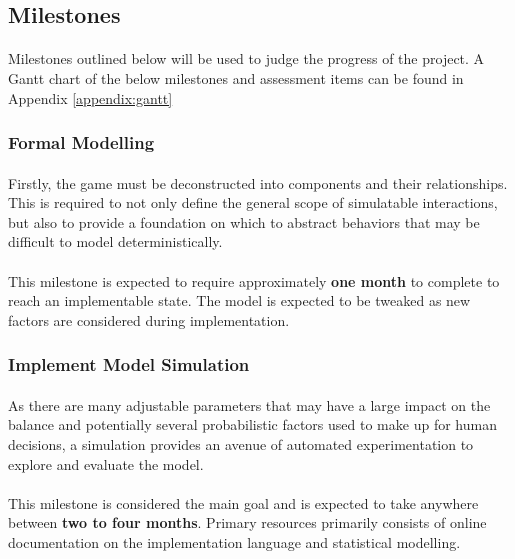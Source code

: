 \subsection{Milestones}

\paragraph{} Milestones outlined below will be used to judge the progress of the project. A Gantt chart of the below milestones and assessment items can be found in Appendix \ref{appendix:gantt}

\subsubsection{Formal Modelling}

\paragraph{} Firstly, the game must be deconstructed into components and their relationships. This is required to not only define the general scope of simulatable interactions, but also to provide a foundation on which to abstract behaviors that may be difficult to model deterministically.

\paragraph{} This milestone is expected to require approximately \textbf{one month} to complete to reach an implementable state. The model is expected to be tweaked as new factors are considered during implementation.

\subsubsection{Implement Model Simulation}

\paragraph{} As there are many adjustable parameters that may have a large impact on the balance and potentially several probabilistic factors used to make up for human decisions, a simulation provides an avenue of automated experimentation to explore and evaluate the model. 

\paragraph{} This milestone is considered the main goal and is expected to take anywhere between \textbf{two to four months}. Primary resources primarily consists of online documentation on the implementation language and statistical modelling.

